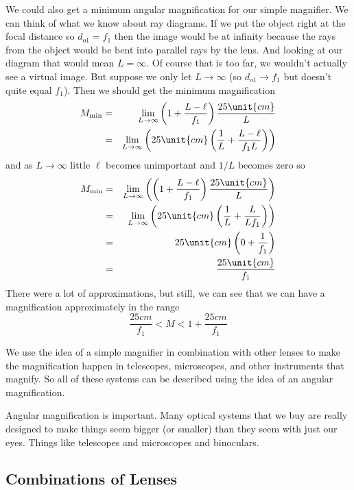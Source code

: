 \documentclass{article}
\begin{document}
We could also get a minimum angular magnification for our simple magnifier.
We can think of what we know about ray diagrams. If we put the object right
at the focal distance so $d_{o1}=f_{1}$ then the image would be at infinity
because the rays from the object would be bent into parallel rays by the
lens. And looking at our diagram that would mean $L=\infty .$ Of course that
is too far, we wouldn't actually see a virtual image. But suppose we only
let $L\rightarrow \infty $ (so $d_{o1}\rightarrow f_{1}$ but doesn't quite
equal $f_{1}$). Then we should get the minimum magnification 
\begin{eqnarray*}
M_{\min } &=&\underset{L\rightarrow \infty }{\lim }\left( 1+\frac{L-\ell }{%
f_{1}}\right) \frac{25\unit{cm}}{L} \\
&=&\underset{L\rightarrow \infty }{\lim }\left( 25\unit{cm}\left( \frac{1}{L}%
+\frac{L-\ell }{f_{1}L}\right) \right)
\end{eqnarray*}%
and as $L\rightarrow \infty $ little $\ell $ becomes unimportant and $1/L$
becomes zero so 
\begin{eqnarray*}
M_{\min } &=&\underset{L\rightarrow \infty }{\lim }\left( \left( 1+\frac{%
L-\ell }{f_{1}}\right) \frac{25\unit{cm}}{L}\right) \\
&=&\underset{L\rightarrow \infty }{\lim }\left( 25\unit{cm}\left( \frac{1}{L}%
+\frac{L}{Lf_{1}}\right) \right) \\
&=&25\unit{cm}\left( 0+\frac{1}{f_{1}}\right) \\
&=&\frac{25\unit{cm}}{f_{1}}
\end{eqnarray*}%
There were a lot of approximations, but still, we can see that we can have a
magnification approximately in the range 
\[
\frac{25\unit{cm}}{f_{1}}<M<1+\frac{25\unit{cm}}{f_{1}}
\]

We use the idea of a simple magnifier in combination with other lenses to
make the magnification happen in telescopes, microscopes, and other
instruments that magnify. So all of these systems can be described using the
idea of an angular magnification.

Angular magnification is important. Many optical systems that we buy are
really designed to make things seem bigger (or smaller) than they seem with
just our eyes. Things like telescopes and microscopes and binoculars.

\subsection{Combinations of Lenses}
\end{document}
